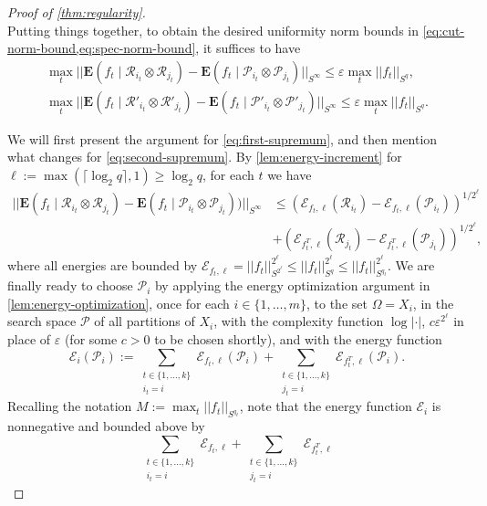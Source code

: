 \documentclass[reqno,11pt]{amsart}
\theoremstyle{definition}
\theoremstyle{remark}
\numberwithin{equation}{section}
\newcommand{\E}{\mathbf{E}}
\newcommand{\mE}{\mathcal{E}}
\newcommand{\mR}{\mathcal{R}}
\newcommand{\mP}{\mathcal{P}}
\newcommand{\eps}{\varepsilon}
\begin{document}
\begin{proof}[Proof of \cref{thm:regularity}]
\[\]
Putting things together, to obtain the desired uniformity norm bounds in \cref{eq:cut-norm-bound,eq:spec-norm-bound}, it suffices to have
\begin{gather}
    \max_t ||\E(f_t \mid \mR_{i_t} \otimes \mR_{j_t}) - \E(f_t \mid \mP_{i_t} \otimes \mP_{j_t})||_{S^\infty} \le \eps \max_t ||f_t||_{S^q}, \label{eq:first-supremum}
    \\
    \max_t ||\E(f_t \mid \mR'_{i_t} \otimes \mR'_{j_t}) - \E(f_t \mid \mP'_{i_t} \otimes \mP'_{j_t})||_{S^\infty} \le \eps \max_t ||f_t||_{S^q}.
    \label{eq:second-supremum}
\end{gather}

We will first present the argument for \cref{eq:first-supremum}, and then mention what changes for \cref{eq:second-supremum}. By \cref{lem:energy-increment} for $\ell := \max(\lceil \log_2 q \rceil, 1) \ge \log_2 q$, for each $t$ we have
\begin{equation} \label{eq:final-energy-bound}
\begin{aligned}
    ||\E(f_t \mid \mR_{i_t} \otimes \mR_{j_t}) - \E(f_t \mid \mP_{i_t} \otimes \mP_{j_t}))||_{S^\infty}
    &\le 
    (\mE_{f_t,\ell}(\mR_{i_t}) - \mE_{f_t,\ell}(\mP_{i_t}))^{1/2^\ell} 
    \\
    &+ 
    (\mE_{f_t^T,\ell}(\mR_{j_t}) - \mE_{f_t^T,\ell}(\mP_{j_t}))^{1/2^\ell},
\end{aligned}
\end{equation}
where all energies are bounded by $\mE_{f_t,\ell} = ||f_t||_{S^{2^\ell}}^{2^\ell} \le ||f_t||_{S^q}^{2^\ell} \le ||f_t||_{S^{q_t}}^{2^\ell}$. We are finally ready to choose $\mP_i$ by applying the energy optimization argument in \cref{lem:energy-optimization}, once for each $i \in \{1, \ldots, m\}$, to the set $\Omega = X_i$, in the search space $\mathscr{P}$ of all partitions of $X_i$, with the complexity function $\log |\cdot|$, $c\eps^{2^\ell}$ in place of $\eps$ (for some $c > 0$ to be chosen shortly), and with the energy function
\[
    \mE_i(\mP_i) := \sum_{\substack{t \in \{1, \ldots, k\} \\ i_t = i}} \mE_{f_t,\ell}(\mP_i) + \sum_{\substack{t \in \{1, \ldots, k\} \\ j_t = i}} \mE_{f_t^T,\ell}(\mP_i).
\]
Recalling the notation $M := \max_t ||f_t||_{S^{q_t}}$, note that the energy function $\mE_i$ is nonnegative and bounded above by
\[
    \sum_{\substack{t \in \{1, \ldots, k\} \\ i_t = i}} \mE_{f_t,\ell} + 
    \sum_{\substack{t \in \{1, \ldots, k\} \\ j_t = i}} \mE_{f_t^T,\ell} 
\]
\end{proof}
\end{document}
